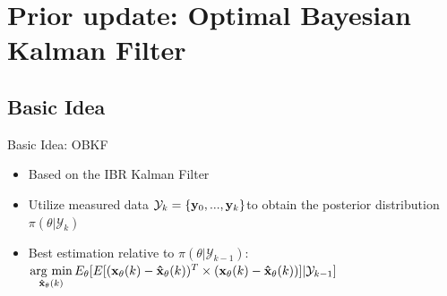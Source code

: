 \section{Prior update: Optimal Bayesian Kalman Filter}

\begin{frame}
    \tableofcontents[currentsection]
\end{frame}

\subsection{Basic Idea}
\begin{frame}{Basic Idea: OBKF}
    \begin{itemize}
        \item Based on the IBR Kalman Filter
        \item Utilize measured data $\mathcal{Y}_{k}=\{{\bf y}_0,...,{\bf y}_{k}\}$to obtain the posterior distribution $\pi(\theta|\mathcal{Y}_k)$
        \item Best estimation relative to $\pi(\theta|\mathcal{Y}_{k-1})$: $\mathop{\rm arg~min}\limits_{{\bf \hat x_\theta}(k)} E_\theta[E[({\bf x_\theta}(k) - {\bf \hat x_\theta}(k))^T\times ({\bf x_\theta}(k) - {\bf \hat x_\theta}(k))]|\mathcal{Y}_{k-1}]$
    \end{itemize}
\end{frame}


